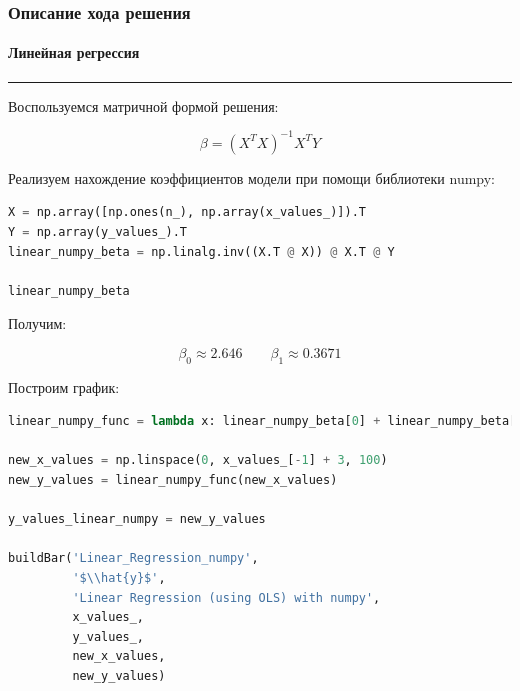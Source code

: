 \documentclass[a4paper, 14pt]{extarticle}
\begin{document}
\subsubsection*{{Описание хода решения}}

\paragraph*{{Линейная регрессия}}\vspace{-20pt}\rule{\linewidth}{0.1mm}

Воспользуемся матричной формой решения:

\begin{equation*}
    \beta = (X^T X)^{-1} X^T Y
\end{equation*}

Реализуем нахождение коэффициентов модели при помощи библиотеки numpy:

\begin{center}
    \begin{lstlisting}[language=Python]
X = np.array([np.ones(n_), np.array(x_values_)]).T
Y = np.array(y_values_).T
linear_numpy_beta = np.linalg.inv((X.T @ X)) @ X.T @ Y

linear_numpy_beta
    \end{lstlisting}
\end{center}

Получим:

\begin{equation*}
    \beta_0 \approx 2.646 \qquad \beta_1 \approx 0.3671
\end{equation*}

Построим график:

\begin{center}
    \begin{lstlisting}[language=Python]
linear_numpy_func = lambda x: linear_numpy_beta[0] + linear_numpy_beta[1] * x

new_x_values = np.linspace(0, x_values_[-1] + 3, 100)
new_y_values = linear_numpy_func(new_x_values)

y_values_linear_numpy = new_y_values

buildBar('Linear_Regression_numpy', 
         '$\\hat{y}$', 
         'Linear Regression (using OLS) with numpy', 
         x_values_, 
         y_values_, 
         new_x_values, 
         new_y_values)
    \end{lstlisting}
\end{center}
\end{document}
